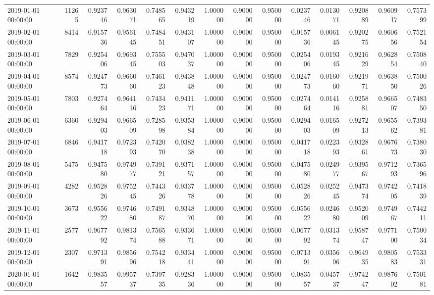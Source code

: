 \begin{tabular}{lrrrrrrrrrrrrr}
2019-01-01 00:00:00 & 11265 & 0.923746 & 0.963071 & 0.748565 & 0.943219 & 1.000000 & 0.900000 & 0.950000 & 0.023746 & 0.013071 & 0.920889 & 0.960917 & 0.757399 \\
2019-02-01 00:00:00 & 8414 & 0.915736 & 0.956145 & 0.748451 & 0.943107 & 1.000000 & 0.900000 & 0.950000 & 0.015736 & 0.006145 & 0.920275 & 0.960656 & 0.752154 \\
2019-03-01 00:00:00 & 7829 & 0.925406 & 0.969345 & 0.755503 & 0.947037 & 1.000000 & 0.900000 & 0.950000 & 0.025406 & 0.019345 & 0.921629 & 0.962854 & 0.750840 \\
2019-04-01 00:00:00 & 8574 & 0.924773 & 0.966060 & 0.746123 & 0.943848 & 1.000000 & 0.900000 & 0.950000 & 0.024773 & 0.016060 & 0.921971 & 0.963850 & 0.750026 \\
2019-05-01 00:00:00 & 7803 & 0.927464 & 0.964116 & 0.743423 & 0.941171 & 1.000000 & 0.900000 & 0.950000 & 0.027464 & 0.014116 & 0.925881 & 0.966507 & 0.748350 \\
2019-06-01 00:00:00 & 6360 & 0.929403 & 0.966509 & 0.728598 & 0.935384 & 1.000000 & 0.900000 & 0.950000 & 0.029403 & 0.016509 & 0.927213 & 0.965562 & 0.739381 \\
2019-07-01 00:00:00 & 6846 & 0.941718 & 0.972393 & 0.742070 & 0.938238 & 1.000000 & 0.900000 & 0.950000 & 0.041718 & 0.022393 & 0.932861 & 0.967673 & 0.738030 \\
2019-08-01 00:00:00 & 5475 & 0.947580 & 0.974977 & 0.739121 & 0.937157 & 1.000000 & 0.900000 & 0.950000 & 0.047580 & 0.024977 & 0.939567 & 0.971293 & 0.736596 \\
2019-09-01 00:00:00 & 4282 & 0.952826 & 0.975245 & 0.744326 & 0.933778 & 1.000000 & 0.900000 & 0.950000 & 0.052826 & 0.025245 & 0.947374 & 0.974205 & 0.741839 \\
2019-10-01 00:00:00 & 3673 & 0.955622 & 0.974680 & 0.749187 & 0.934870 & 1.000000 & 0.900000 & 0.950000 & 0.055622 & 0.024680 & 0.952009 & 0.974967 & 0.744211 \\
2019-11-01 00:00:00 & 2577 & 0.967792 & 0.981374 & 0.756588 & 0.933671 & 1.000000 & 0.900000 & 0.950000 & 0.067792 & 0.031374 & 0.958747 & 0.977100 & 0.750034 \\
2019-12-01 00:00:00 & 2307 & 0.971391 & 0.985696 & 0.754218 & 0.933441 & 1.000000 & 0.900000 & 0.950000 & 0.071391 & 0.035696 & 0.964935 & 0.980583 & 0.753331 \\
2020-01-01 00:00:00 & 1642 & 0.983557 & 0.995737 & 0.739735 & 0.928336 & 1.000000 & 0.900000 & 0.950000 & 0.083557 & 0.045737 & 0.974247 & 0.987602 & 0.750181 \\

\end{tabular}
